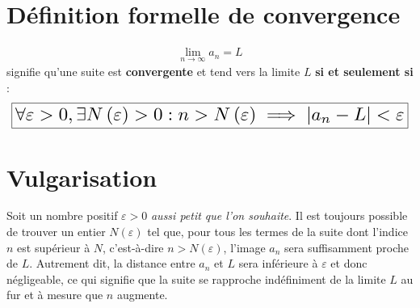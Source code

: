 \documentclass{report}
\begin{document}
\begin{multicols*}{3}
\begin{center}
\end{center}
    

    \section{Définition formelle de convergence}
    \vspace{-1em}
    \begin{align*}
        \lim\limits_{n\to \infty}a_n = L 
    \end{align*}
    signifie qu'une suite est \textcolor{myb}{\textbf{convergente }} et tend vers la limite $L$ 
    \textbf{si et seulement si} :
    \vspace{1em}
    \[%
        \boxed{\resizebox{1\linewidth}{!}{$
        \forall\varepsilon > 0, \exists N\left( \varepsilon \right) > 0 : 
        n > N\left( \varepsilon \right) \implies |a_n -L| < \varepsilon
    $}}
    \]%

    \section{Vulgarisation}
    Soit un nombre positif $\varepsilon > 0$ \textit{aussi petit que l'on souhaite}. Il est toujours possible de trouver un entier 
    $N(\varepsilon)$ tel que, pour tous les termes de la suite dont l'indice $n$ est supérieur à 
    $N$, c'est-à-dire $n > N(\varepsilon)$, l'image $a_n$ sera suffisamment proche de $L$. 
    Autrement dit, la distance entre $a_n$ et $L$ sera inférieure à $\varepsilon$ et donc négligeable, 
    ce qui signifie que la suite se rapproche indéfiniment de la limite $L$ au fur et à mesure que $n$ augmente.
    \vspace{-2em}


    \begin{center}
        \begin{tikzpicture}[scale=.85]



\end{tikzpicture}
\end{center}
\end{multicols*}
\end{document}
